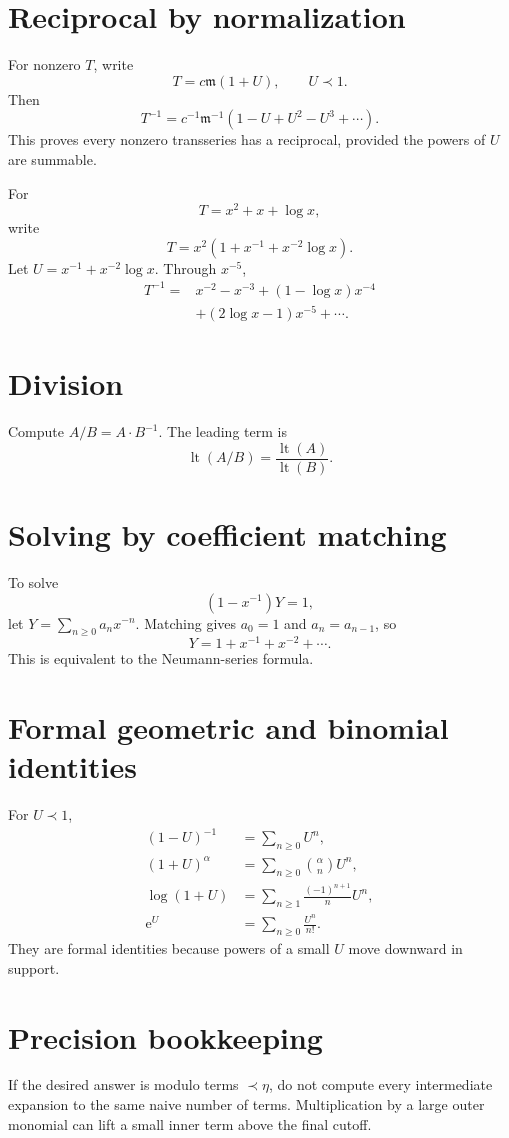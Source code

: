 \documentclass[11pt,oneside,openany]{book}
\newcommand{\e}{\mathrm{e}}
\newcommand{\mon}{\mathfrak{m}}
\theoremstyle{plain}
\theoremstyle{definition}
\theoremstyle{remark}
\begin{document}
\section{Reciprocal by normalization}
For nonzero $T$, write
\[
  T=c\mon(1+U),
  \qquad U\prec1.
\]
Then
\[
  T^{-1}=c^{-1}\mon^{-1}
  (1-U+U^2-U^3+\cdots).
\]
This proves every nonzero transseries has a reciprocal, provided the powers of $U$ are summable.

\begin{worked}
For
\[
  T=x^2+x+\log x,
\]
write
\[
  T=x^2\left(1+x^{-1}+x^{-2}\log x\right).
\]
Let $U=x^{-1}+x^{-2}\log x$. Through $x^{-5}$,
\[
\begin{aligned}
T^{-1}
={}&x^{-2}-x^{-3}+(1-\log x)x^{-4}\\
&+(2\log x-1)x^{-5}+\cdots.
\end{aligned}
\]
\end{worked}

\section{Division}
Compute $A/B=A\cdot B^{-1}$. The leading term is
\[
  \operatorname{lt}(A/B)
  =\frac{\operatorname{lt}(A)}{\operatorname{lt}(B)}.
\]

\section{Solving by coefficient matching}
To solve
\[
  (1-x^{-1})Y=1,
\]
let $Y=\sum_{n\ge0}a_nx^{-n}$. Matching gives $a_0=1$ and $a_n=a_{n-1}$, so
\[
  Y=1+x^{-1}+x^{-2}+\cdots.
\]
This is equivalent to the Neumann-series formula.

\section{Formal geometric and binomial identities}
For $U\prec1$,
\[
\begin{aligned}
(1-U)^{-1}&=\sum_{n\ge0}U^n,\\
(1+U)^\alpha&=\sum_{n\ge0}\binom\alpha nU^n,\\
\log(1+U)&=\sum_{n\ge1}\frac{(-1)^{n+1}}nU^n,\\
\e^U&=\sum_{n\ge0}\frac{U^n}{n!}.
\end{aligned}
\]
They are formal identities because powers of a small $U$ move downward in support.

\section{Precision bookkeeping}
If the desired answer is modulo terms $\prec\eta$, do not compute every intermediate expansion to the same naive number of terms. Multiplication by a large outer monomial can lift a small inner term above the final cutoff.
\end{document}
